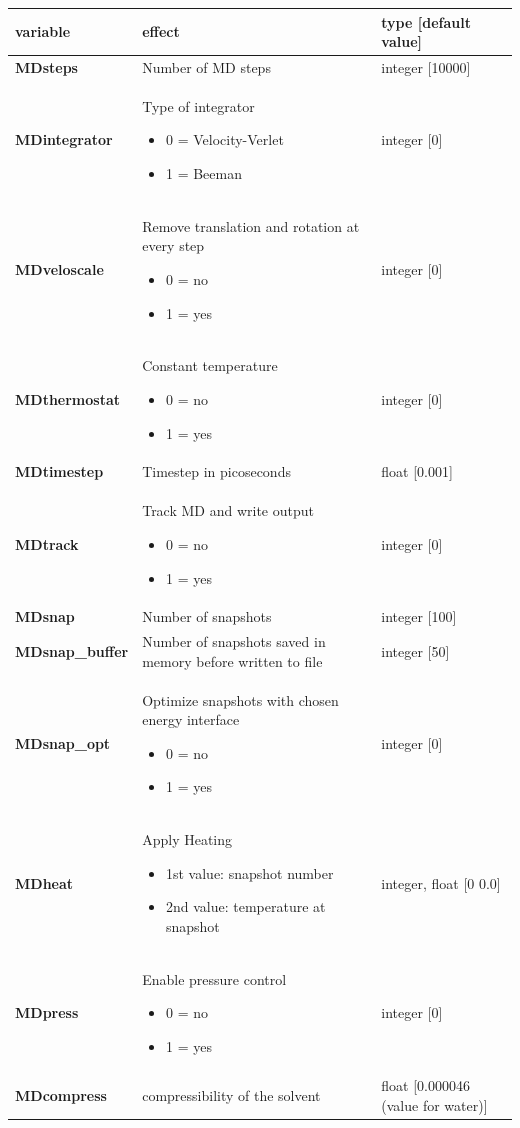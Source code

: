 \documentclass[10pt,a4paper]{article} %
\begin{document}
	\begin{tabularx}{\textwidth}{l|X|X}
		variable & effect & type [default value] \\
		\hline
		\textbf{MDsteps} & Number of MD steps & integer [10000] \\
		\textbf{MDintegrator} & Type of integrator \begin{itemize}
			\item 0  = Velocity-Verlet \item 1 = Beeman\end{itemize} 	
		& integer [0] \\
		\textbf{MDveloscale} & Remove translation and rotation at every step\begin{itemize} \item 0 = no \item 1 = yes\end{itemize}& integer [0] \\
		\textbf{MDthermostat} & Constant temperature\begin{itemize} \item 0 = no \item 1 = yes\end{itemize}
		 & integer [0] \\
		\textbf{MDtimestep} & Timestep in picoseconds & float [0.001] \\
		\textbf{MDtrack} & Track MD and write output\begin{itemize} \item 0 = no \item 1 = yes\end{itemize}& integer [0] \\
		\textbf{MDsnap} & Number of snapshots & integer [100] \\
		\textbf{MDsnap_buffer} & Number of snapshots saved in memory before written to file & integer [50] \\
		\textbf{MDsnap_opt} & Optimize snapshots with chosen energy interface\begin{itemize} \item 0 = no \item 1 = yes\end{itemize} & integer [0] \\
		\textbf{MDheat}  & Apply Heating \begin{itemize}\item1st value: snapshot number\item2nd value: temperature at snapshot\end{itemize} & integer, float [0 0.0]\\
		\textbf{MDpress} & Enable pressure control\begin{itemize} \item 0 = no \item 1 = yes\end{itemize}& integer [0]\\
		\textbf{MDcompress} & compressibility of the solvent & float [0.000046 (value for water)] 
	\end{tabularx} ~\\ 
	
\end{document}
